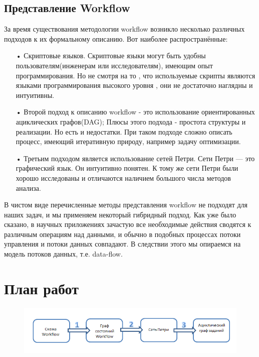 \documentclass[a4paper,14pt]{article}
\begin{document}
\subsection*{Представление Workflow}
За время существования методологии workflow возникло несколько различных подходов к их формальному описанию. Вот наиболее распространённые:
\begin{enumerate}
\item[•] Скриптовые языков.
 Скриптовые языки могут быть удобны пользователям(инженерам или исследователям), имеющим опыт программирования. Но не смотря на то , что  используемые  скрипты являются языками программирования высокого уровня , они не достаточно наглядны и интуитивны.
\item[•] Второй подход к описанию workflow - это использование ориентированных ациклических графов(DAG);
 Плюсы этого подхода - простота структуры и реализации.
  Но есть и недостатки. При таком подходе сложно описать процесс, имеющий итеративную природу, например задачу оптимизации. 
\item[•] Третьим подходом является использование сетей Петри.
 Сети Петри — это графический язык. Он
интуитивно понятен. К тому же сети Петри были хорошо исследованы и отличаются наличием большого числа методов анализа.
\end{enumerate}

В чистом виде перечисленные методы представления workflow не подходят для наших задач, и мы применяем некоторый гибридный подход.
 Как уже было сказано, в научных приложениях зачастую все необходимые действия сводятся к различным операциям над данными, и обычно в подобных процессах потоки управления и потоки данных совпадают. В следствии этого мы опираемся на модель потоков данных, т.е. data-flow.
 
 
\section{План работ}

\begin{figure}[here]
    \centering
    \includegraphics[width=\textwidth]{analys_plan.png}

    \label{img:opt_wf}
\end{figure}
\end{document}
